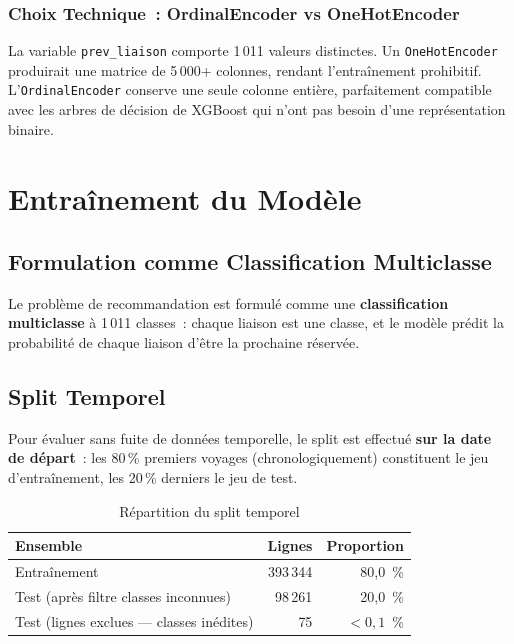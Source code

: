 \documentclass[12pt, a4paper]{report}
\begin{document}
\subsubsection{Choix Technique~: OrdinalEncoder vs OneHotEncoder}

La variable \texttt{prev\_liaison} comporte 1\,011 valeurs distinctes. Un
\texttt{OneHotEncoder} produirait une matrice de 5\,000+ colonnes, rendant
l'entraînement prohibitif. L'\texttt{OrdinalEncoder} conserve une seule
colonne entière, parfaitement compatible avec les arbres de décision de
XGBoost qui n'ont pas besoin d'une représentation binaire.

\section{Entraînement du Modèle}

\subsection{Formulation comme Classification Multiclasse}

Le problème de recommandation est formulé comme une \textbf{classification
multiclasse} à 1\,011 classes~: chaque liaison est une classe, et le modèle
prédit la probabilité de chaque liaison d'être la prochaine réservée.

\subsection{Split Temporel}

Pour évaluer sans fuite de données temporelle, le split est effectué
\textbf{sur la date de départ}~: les 80\,\% premiers voyages (chronologiquement)
constituent le jeu d'entraînement, les 20\,\% derniers le jeu de test.

\begin{table}[H]
\centering
\caption{Répartition du split temporel}
\label{tab:split}
\begin{tabular}{|l|r|r|}
\hline
\textbf{Ensemble} & \textbf{Lignes} & \textbf{Proportion} \\
\hline
Entraînement & 393\,344 & 80,0~\% \\
\hline
Test (après filtre classes inconnues) & 98\,261 & 20,0~\% \\
\hline
Test (lignes exclues --- classes inédites) & 75 & $< 0{,}1$~\% \\
\hline
\end{tabular}
\end{table}
\end{document}
